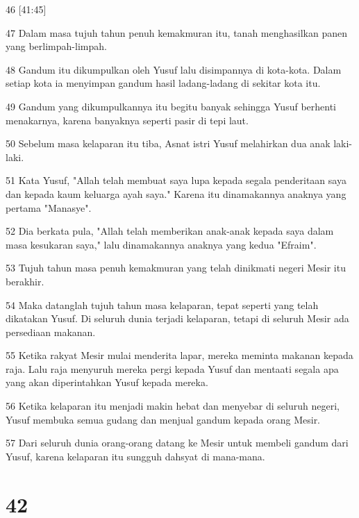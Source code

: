 \par 46 [41:45]
\par 47 Dalam masa tujuh tahun penuh kemakmuran itu, tanah menghasilkan panen yang berlimpah-limpah.
\par 48 Gandum itu dikumpulkan oleh Yusuf lalu disimpannya di kota-kota. Dalam setiap kota ia menyimpan gandum hasil ladang-ladang di sekitar kota itu.
\par 49 Gandum yang dikumpulkannya itu begitu banyak sehingga Yusuf berhenti menakarnya, karena banyaknya seperti pasir di tepi laut.
\par 50 Sebelum masa kelaparan itu tiba, Asnat istri Yusuf melahirkan dua anak laki-laki.
\par 51 Kata Yusuf, "Allah telah membuat saya lupa kepada segala penderitaan saya dan kepada kaum keluarga ayah saya." Karena itu dinamakannya anaknya yang pertama "Manasye".
\par 52 Dia berkata pula, "Allah telah memberikan anak-anak kepada saya dalam masa kesukaran saya," lalu dinamakannya anaknya yang kedua "Efraim".
\par 53 Tujuh tahun masa penuh kemakmuran yang telah dinikmati negeri Mesir itu berakhir.
\par 54 Maka datanglah tujuh tahun masa kelaparan, tepat seperti yang telah dikatakan Yusuf. Di seluruh dunia terjadi kelaparan, tetapi di seluruh Mesir ada persediaan makanan.
\par 55 Ketika rakyat Mesir mulai menderita lapar, mereka meminta makanan kepada raja. Lalu raja menyuruh mereka pergi kepada Yusuf dan mentaati segala apa yang akan diperintahkan Yusuf kepada mereka.
\par 56 Ketika kelaparan itu menjadi makin hebat dan menyebar di seluruh negeri, Yusuf membuka semua gudang dan menjual gandum kepada orang Mesir.
\par 57 Dari seluruh dunia orang-orang datang ke Mesir untuk membeli gandum dari Yusuf, karena kelaparan itu sungguh dahsyat di mana-mana.

\chapter{42}

